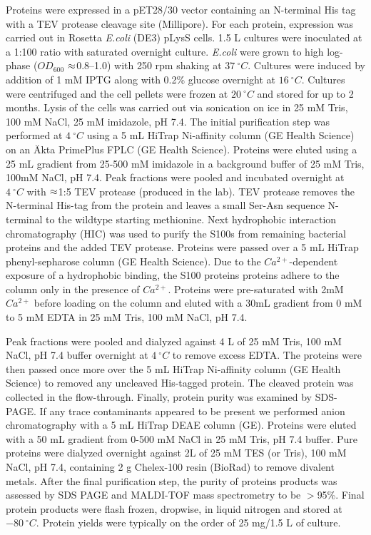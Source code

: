 Proteins were expressed in a pET28/30 vector containing an N-terminal
His tag with a TEV protease cleavage site (Millipore). For each protein,
expression was carried out in Rosetta \emph{E.coli} (DE3) pLysS cells.
1.5 L cultures were inoculated at a 1:100 ratio with saturated overnight
culture. \emph{E.coli} were grown to high log-phase ($OD_{600}$ $\text{\ensuremath{\approx}}$0.8--1.0)
with 250 rpm shaking at $37\ ^{\circ}C$. Cultures were induced by
addition of 1 mM IPTG along with 0.2\% glucose overnight at $16\ ^{\circ}C$.
Cultures were centrifuged and the cell pellets were frozen at $20\ ^{\circ}C$
and stored for up to 2 months. Lysis of the cells was carried out
via sonication on ice in 25 mM Tris, 100 mM NaCl, 25 mM imidazole,
pH 7.4. The initial purification step was performed at $4\ ^{\circ}C$
using a 5 mL HiTrap Ni-affinity column (GE Health Science) on an Äkta
PrimePlus FPLC (GE Health Science). Proteins were eluted using a 25
mL gradient from 25-500 mM imidazole in a background buffer of 25
mM Tris, 100mM NaCl, pH 7.4. Peak fractions were pooled and incubated
overnight at $4\ ^{\circ}C$ with $\text{\ensuremath{\approx}}$1:5
TEV protease (produced in the lab). TEV protease removes the N-terminal
His-tag from the protein and leaves a small Ser-Asn sequence N-terminal
to the wildtype starting methionine. Next hydrophobic interaction
chromatography (HIC) was used to purify the S100s from remaining bacterial
proteins and the added TEV protease. Proteins were passed over a 5
mL HiTrap phenyl-sepharose column (GE Health Science). Due to the
$Ca^{2+}$-dependent exposure of a hydrophobic binding, the S100 proteins
proteins adhere to the column only in the presence of $Ca^{2+}$.
Proteins were pre-saturated with 2mM $Ca^{2+}$ before loading on
the column and eluted with a 30mL gradient from 0 mM to 5 mM EDTA
in 25 mM Tris, 100 mM NaCl, pH 7.4. 

Peak fractions were pooled and dialyzed against 4 L of 25 mM Tris,
100 mM NaCl, pH 7.4 buffer overnight at $4\ ^{\circ}C$ to remove
excess EDTA. The proteins were then passed once more over the 5 mL
HiTrap Ni-affinity column (GE Health Science) to removed any uncleaved
His-tagged protein. The cleaved protein was collected in the flow-through.
Finally, protein purity was examined by SDS-PAGE. If any trace contaminants
appeared to be present we performed anion chromatography with a 5
mL HiTrap DEAE column (GE). Proteins were eluted with a 50 mL gradient
from 0-500 mM NaCl in 25 mM Tris, pH 7.4 buffer. Pure proteins were
dialyzed overnight against 2L of 25 mM TES (or Tris), 100 mM NaCl,
pH 7.4, containing 2 g Chelex-100 resin (BioRad) to remove divalent
metals. After the final purification step, the purity of proteins
products was assessed by SDS PAGE and MALDI-TOF mass spectrometry
to be $>$95\%. Final protein products were flash frozen, dropwise, in liquid nitrogen
and stored at $-80\ ^{\circ}C$. Protein yields were typically on
the order of 25 mg/1.5 L of culture.

